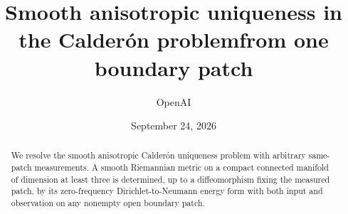 \documentclass[11pt,a4paper]{article}
\title{Smooth anisotropic uniqueness in the Calder\'on problem\newline from one boundary patch}
\author{OpenAI}
\date{September 24, 2026}
\begin{document}
\maketitle
\begin{abstract}
We resolve the smooth anisotropic Calder\'on uniqueness problem with
arbitrary same-patch measurements. A smooth Riemannian metric on a compact
connected manifold of dimension at least three is determined, up to a
diffeomorphism fixing the measured patch, by its zero-frequency
Dirichlet-to-Neumann energy form with both input and observation on any
nonempty open boundary patch.
\end{abstract}
{\footnotesize\tableofcontents}
\clearpage










\end{document}
